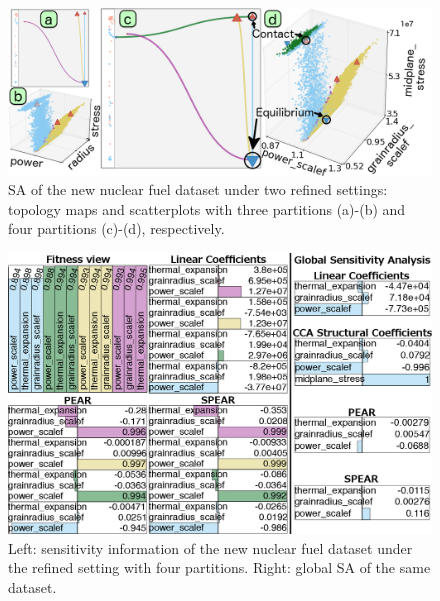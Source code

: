 \begin{figure}[!h]
  \centering
  \includegraphics[width=\linewidth]{figs/chap6/bisonRefined3}
  \caption{
  SA of the new nuclear fuel dataset under two refined settings:
  topology maps and scatterplots with three partitions (a)-(b) and four partitions (c)-(d), respectively.}
  \label{fig:bisonRefined}
\end{figure}

\begin{figure}[!h]
  \centering
  \includegraphics[width=.48\textwidth]{figs/chap6/bisonRefinedSensitivity2}
  \caption{
  Left: sensitivity information of the new nuclear fuel dataset under the refined setting with four partitions.
  Right: global SA of the same dataset.
  }
  \label{fig:bisonRefined_sensitivity}
\end{figure}

